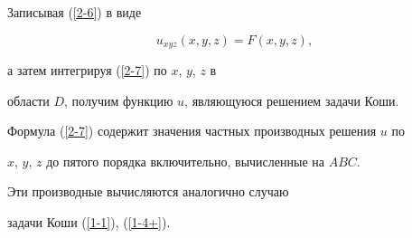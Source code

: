 Записывая (\ref{2-6}) в виде


\begin{equation}\label{2-7}


u_{xyz}(x,y,z)=F(x,y,z),


\end{equation}


а затем интегрируя (\ref{2-7}) по $x$, $y$, $z$ в


области $D$, получим функцию $u$, являющуюся решением задачи Коши.





Формула (\ref{2-7}) содержит значения частных производных решения $u$ по


$x$, $y$, $z$ до пятого порядка включительно, вычисленные на $ABC$.


Эти производные вычисляются аналогично случаю


задачи Коши (\ref{1-1}), (\ref{1-4+}).





